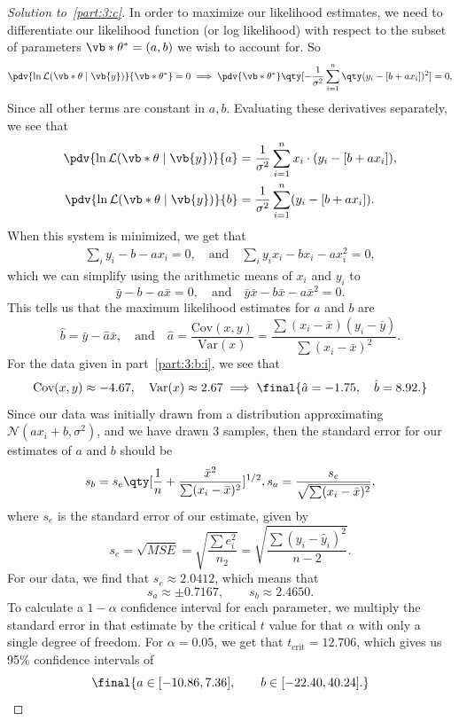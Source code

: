 \documentclass[10pt, physics]{homework}
\begin{document}
	\begin{proof}[Solution to~\ref{part:3:c}]
		In order to maximize our likelihood estimates, we need to differentiate our likelihood function (or log likelihood) with respect to the subset of parameters $\vb*{\theta^*} = (a,b)$ we wish to account for.
		So
		\begin{align*}
			\pdv{\ln\mathcal{L}(\vb*{\theta} \mid \vb{y})}{\vb*{\theta^*}} = 0 \implies \pdv{\vb*{\theta^*}}\qty[-\frac{1}{\sigma^2}\sum_{i=1}^n \qty(y_i - [b + ax_i])^2] = 0,
		\end{align*}
		Since all other terms are constant in $a,b$.
		Evaluating these derivatives separately, we see that
		\begin{align*}
			\pdv{\ln\mathcal{L}(\vb*{\theta} \mid \vb{y})}{a} &= \frac{1}{\sigma^2}\sum_{i=1}^n x_i\cdot(y_i - [b + ax_i]), \\
			\pdv{\ln\mathcal{L}(\vb*{\theta} \mid \vb{y})}{b} &= \frac{1}{\sigma^2}\sum_{i=1}^n (y_i-[b+ax_i]).
		\end{align*}
		When this system is minimized, we get that
		\begin{align*}
			\sum_i y_i - b - ax_i = 0, \quad\text{and}\quad\sum_i y_ix_i - bx_i -ax_i^2 = 0,
		\end{align*}
		which we can simplify using the arithmetic means of $x_i$ and $y_i$ to 
		\[ \bar{y}-b-a\bar{x} = 0,\quad\text{and}\quad \bar{y}\bar{x}-b\bar{x}-a\bar{x}^2 = 0. \]
		This tells us that the maximum likelihood estimates for $a$ and $b$ are
		\[ \hat{b} = \bar{y} - \hat{a}\bar{x},\quad\text{and}\quad \hat{a} = \frac{\text{Cov}(x,y)}{\text{Var}(x)} = \frac{\sum (x_i-\bar{x})(y_i-\bar{y})}{\sum(x_i-\bar{x})^2}. \]
		For the data given in part~\ref{part:3:b:i}, we see that
		\[ \text{Cov}(x,y) \approx -4.67,\quad\text{Var}(x) \approx 2.67 \implies \final{\hat{a} = -1.75,\quad \hat{b} = 8.92.}\]
		Since our data was initially drawn from a distribution approximating $\mathcal{N}(ax_i+b,\sigma^2)$, and we have drawn 3 samples, then the standard error for our estimates of $a$ and $b$ should be 
		\[ s_b = s_e\qty[\frac{1}{n} + \frac{\bar{x}^2}{\sum(x_i-\bar{x})^2}]^{1/2}, s_a = \frac{s_e}{\sqrt{\sum(x_i-\bar{x})^2}}, \]
		where $s_e$ is the standard error of our estimate, given by 
		\[ s_e = \sqrt{MSE} = \sqrt{\frac{\sum e_i^2}{n_2}} = \sqrt{\frac{\sum(y_i - \hat{y}_i)^2}{n-2}}. \]
		For our data, we find that $s_e \approx 2.0412$, which means that 
		\[ s_a \approx \pm 0.7167,\qquad s_b \approx 2.4650. \]
		To calculate a $1-\alpha$ confidence interval for each parameter, we multiply the standard error in that estimate by the critical $t$ value for that $\alpha$ with only a single degree of freedom.
		For $\alpha = 0.05$, we get that $t_{\text{crit}} = 12.706$,
		which gives us 95\% confidence intervals of 
		\[ \final{a \in [-10.86, 7.36],\qquad b \in [-22.40, 40.24].}\qedhere \]
	\end{proof}
\end{document}
